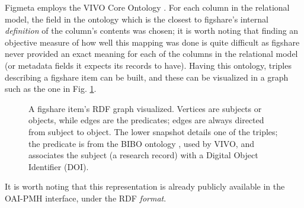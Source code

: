 Figmeta employs the VIVO Core Ontology \cite{vivo}. For each column in the relational model, the field in the ontology which is the closest to figshare's internal
\emph{definition} of the column's contents was chosen; it is worth noting that finding an objective measure of how well this mapping was done is quite difficult as figshare never provided an
exact meaning for each of the columns in the relational model (or metadata fields it expects its records to have). Having this ontology, triples describing a figshare item can be built,
and these can be visualized in a graph such as the one in Fig. \ref{fig:graph}.

\begin{figure}[thpb]
  \centering
  \caption{A figshare item's RDF graph visualized. Vertices are subjects or objects, while edges are the predicates; edges are always directed from subject to object. The lower snapshot details one of the triples; the predicate is  from the BIBO ontology \cite{bibo}, used by VIVO, and associates the subject (a research record) with a Digital Object Identifier (DOI).}
  \label{fig:graph}
\end{figure}

It is worth noting that this representation is already publicly available in the OAI-PMH interface, under
the RDF \emph{format}.

